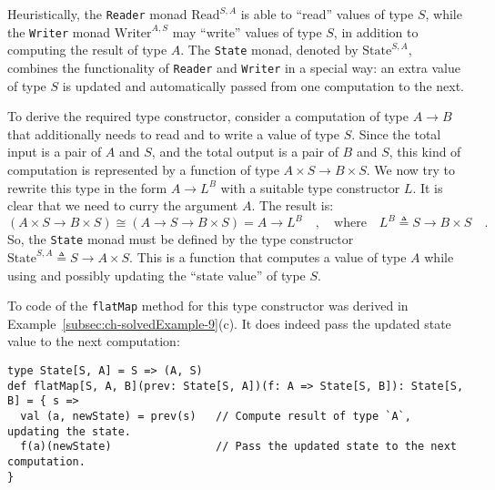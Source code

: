 Heuristically, the \lstinline!Reader! monad $\text{Read}^{S,A}$
is able to \textsf{``}read\textsf{''} values of type $S$, while the \lstinline!Writer!
monad $\text{Writer}^{A,S}$ may \textsf{``}write\textsf{''} values of type $S$,
in addition to computing the result of type $A$. The \lstinline!State!
monad, denoted by $\text{State}^{S,A}$, combines the functionality
of \lstinline!Reader! and \lstinline!Writer! in a special way: an
extra value of type $S$ is updated and automatically passed from
one computation to the next. 

To derive the required type constructor, consider a computation of
type $A\rightarrow B$ that additionally needs to read and to write
a value of type $S$. Since the total input is a pair of $A$ and
$S$, and the total output is a pair of $B$ and $S$, this kind of
computation is represented by a function of type $A\times S\rightarrow B\times S$.
We now try to rewrite this type in the form $A\rightarrow L^{B}$
with a suitable type constructor $L$. It is clear that we need to
curry the argument $A$. The result is:
\[
\left(A\times S\rightarrow B\times S\right)\cong\left(A\rightarrow S\rightarrow B\times S\right)=A\rightarrow L^{B}\quad,\quad\text{where}\quad L^{B}\triangleq S\rightarrow B\times S\quad.
\]
So, the \lstinline!State!
monad must be defined by the type constructor $\text{State}^{S,A}\triangleq S\rightarrow A\times S$.
This is a function that computes a value of type $A$ while using
and possibly updating the \textsf{``}state value\textsf{''} of type $S$.

To code of the \lstinline!flatMap! method for this type constructor
was derived in Example~\ref{subsec:ch-solvedExample-9}(c). It does
indeed pass the updated state value to the next computation:
\begin{lstlisting}
type State[S, A] = S => (A, S)
def flatMap[S, A, B](prev: State[S, A])(f: A => State[S, B]): State[S, B] = { s =>
  val (a, newState) = prev(s)   // Compute result of type `A`, updating the state.
  f(a)(newState)                // Pass the updated state to the next computation.
}
\end{lstlisting}

